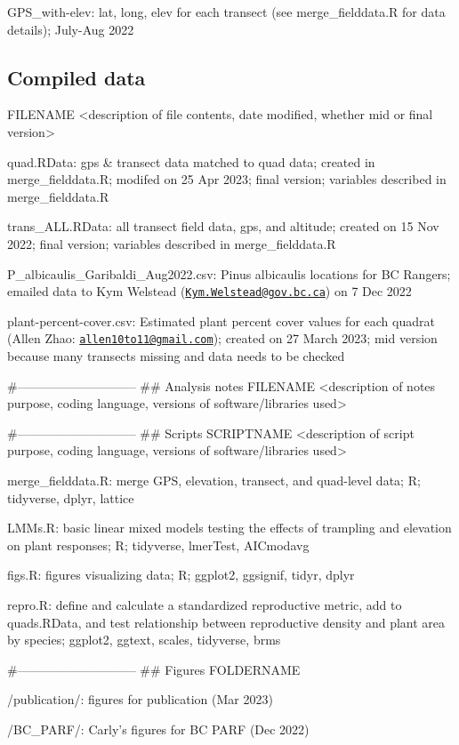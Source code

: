 \documentclass[
]{article}
\begin{document}
GPS\_with-elev: lat, long, elev for each transect (see
merge\_fielddata.R for data details); July-Aug 2022

\hypertarget{compiled-data}{%
\subsection{Compiled data}\label{compiled-data}}

FILENAME \textless description of file contents, date modified, whether
mid or final version\textgreater{}

quad.RData: gps \& transect data matched to quad data; created in
merge\_fielddata.R; modifed on 25 Apr 2023; final version; variables
described in merge\_fielddata.R

trans\_ALL.RData: all transect field data, gps, and altitude; created on
15 Nov 2022; final version; variables described in merge\_fielddata.R

P\_albicaulis\_Garibaldi\_Aug2022.csv: Pinus albicaulis locations for BC
Rangers; emailed data to Kym Welstead
(\href{mailto:Kym.Welstead@gov.bc.ca}{\nolinkurl{Kym.Welstead@gov.bc.ca}})
on 7 Dec 2022

plant-percent-cover.csv: Estimated plant percent cover values for each
quadrat (Allen Zhao:
\href{mailto:allen10to11@gmail.com}{\nolinkurl{allen10to11@gmail.com}});
created on 27 March 2023; mid version because many transects missing and
data needs to be checked

\#----------------------------- \#\# Analysis notes FILENAME
\textless description of notes purpose, coding language, versions of
software/libraries used\textgreater{}

\#----------------------------- \#\# Scripts SCRIPTNAME
\textless description of script purpose, coding language, versions of
software/libraries used\textgreater{}

merge\_fielddata.R: merge GPS, elevation, transect, and quad-level data;
R; tidyverse, dplyr, lattice

LMMs.R: basic linear mixed models testing the effects of trampling and
elevation on plant responses; R; tidyverse, lmerTest, AICmodavg

figs.R: figures visualizing data; R; ggplot2, ggsignif, tidyr, dplyr

repro.R: define and calculate a standardized reproductive metric, add to
quads.RData, and test relationship between reproductive density and
plant area by species; ggplot2, ggtext, scales, tidyverse, brms

\#----------------------------- \#\# Figures FOLDERNAME

/publication/: figures for publication (Mar 2023)

/BC\_PARF/: Carly's figures for BC PARF (Dec 2022)
\end{document}
